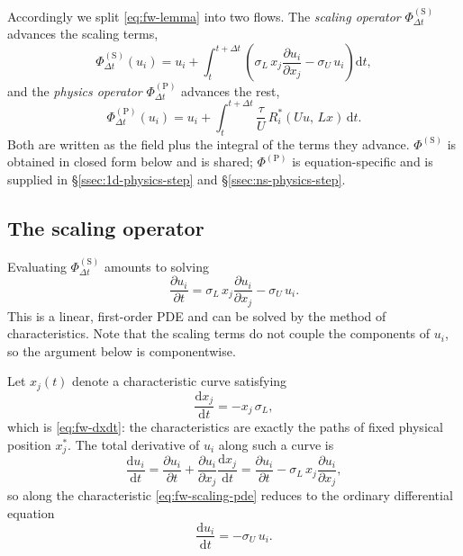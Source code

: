 Accordingly we split \eqref{eq:fw-lemma} into two flows. The \emph{scaling
operator} $\Phi_{\Delta t}^{(\mathrm{S})}$ advances the scaling terms,
\begin{equation}\label{eq:fw-scaling-flow}
  \Phi_{\Delta t}^{(\mathrm{S})}(u_i)
  = u_i + \int_t^{t + \Delta t}
    \left( \sigma_L\, x_j \frac{\partial u_i}{\partial x_j} - \sigma_U\, u_i \right)
    \mathrm{d} t,
\end{equation}
and the \emph{physics operator} $\Phi_{\Delta t}^{(\mathrm{P})}$ advances the
rest,
\begin{equation}\label{eq:fw-physics-flow}
  \Phi_{\Delta t}^{(\mathrm{P})}(u_i)
  = u_i + \int_t^{t + \Delta t} \frac{\tau}{U}\, R_i^*(U u,\, L x)\, \mathrm{d} t .
\end{equation}
Both are written as the field plus the integral of the terms they advance.
$\Phi^{(\mathrm{S})}$ is obtained in closed form below and is shared;
$\Phi^{(\mathrm{P})}$ is equation-specific and is supplied in
\S\ref{ssec:1d-physics-step} and \S\ref{ssec:ns-physics-step}.

\subsection{The scaling operator}\label{ssec:fw-scaling-operator}

Evaluating $\Phi_{\Delta t}^{(\mathrm{S})}$ amounts to solving
\begin{equation}\label{eq:fw-scaling-pde}
  \frac{\partial u_i}{\partial t}
  = \sigma_L\, x_j \frac{\partial u_i}{\partial x_j} - \sigma_U\, u_i .
\end{equation}
This is a linear, first-order PDE and can be solved by the method of
characteristics. Note that the scaling terms do not couple the components of
$u_i$, so the argument below is componentwise.

Let $x_j(t)$ denote a characteristic curve satisfying
\begin{equation}\label{eq:fw-characteristic}
  \frac{\mathrm{d} x_j}{\mathrm{d} t} = -x_j\, \sigma_L ,
\end{equation}
which is \eqref{eq:fw-dxdt}: the characteristics are exactly the paths of
fixed physical position $x_j^*$. The total derivative of $u_i$ along such a
curve is
\begin{equation}\label{eq:fw-total-derivative}
  \frac{\mathrm{d} u_i}{\mathrm{d} t}
  = \frac{\partial u_i}{\partial t} + \frac{\partial u_i}{\partial x_j} \frac{\mathrm{d} x_j}{\mathrm{d} t}
  = \frac{\partial u_i}{\partial t} - \sigma_L\, x_j \frac{\partial u_i}{\partial x_j},
\end{equation}
so along the characteristic \eqref{eq:fw-scaling-pde} reduces to the ordinary
differential equation
\begin{equation}\label{eq:fw-scaling-ode}
  \frac{\mathrm{d} u_i}{\mathrm{d} t} = -\sigma_U\, u_i .
\end{equation}

